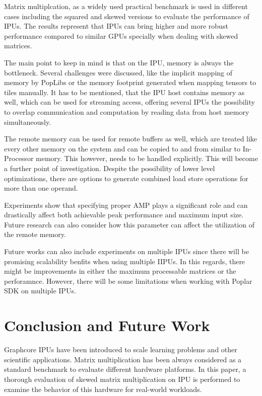 \documentclass[a4paper,UKenglish,cleveref, autoref, thm-restate]{oasics-v2021}
\begin{document}
Matrix multiplcation, as a widely used practical benchmark is used in different cases including the squared and skewed versions to evaluate the performance of IPUs. The results represent that IPUs can bring higher and more robust performance compared to similar GPUs specially when dealing with skewed matrices.

The main point to keep in mind is that on the IPU, memory is always the bottleneck. Several challenges were discussed, like the implicit mapping of memory by PopLibs or the memory footprint generated when mapping tensors to tiles manually. It has to be mentioned, that the IPU host contains memory as well, which can be used for streaming access, offering several IPUs the possibility to overlap communication and computation by reading data from host memory simultaneously. 


The remote memory can be used for remote buffers as well, which are treated like every other memory on the system and can be copied to and from similar to In-Processor memory. This however, needs to be handled explicitly. This will become a further point of investigation. Despite the possibility of lower level optimizations, there are options to generate combined load store operations for more than one operand.

Experiments show that specifying proper AMP plays a significant role and can drastically affect both achievable peak performance and maximum input size. Future research can also consider how this parameter can affect the utilization of the remote memory.

Future works can also include experiments on multiple IPUs since there will be promising scalability benfits when using multiple IIPUs. In this regards, there might be improvements in either the maximum processable matrices or the perforamnce. However, there will be some limitations when working with Poplar SDK on multiple IPUs.


\section{Conclusion and Future Work}
Graphcore IPUs have been introduced to scale learning problems and other scientific applications. 
Matrix multiplication has been always considered as a standard benchmark to evaluate different hardware platforms. In this paper, a thorough evaluation of skewed matrix multiplication on IPU is performed to examine the behavior of this hardware for real-world workloads. 
\end{document}
